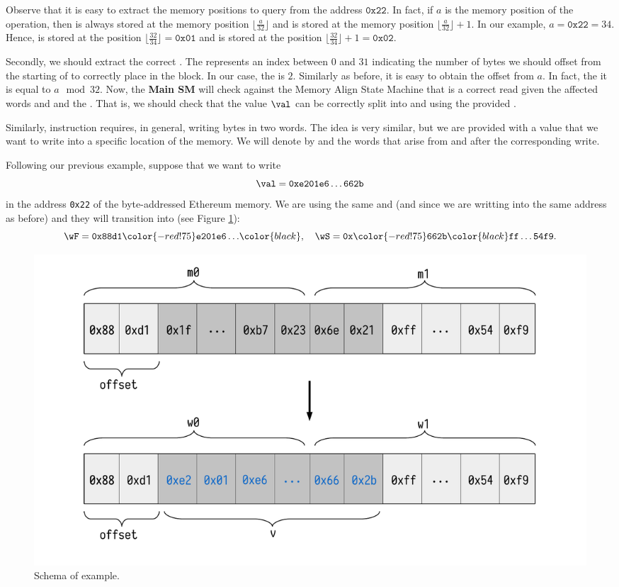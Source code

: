 Observe that it is easy to extract the memory positions to query from the address $\mathtt{0x22}$. In fact, if $a$ is the memory position of the \MLOAD operation, then \mF is always stored at the memory position $\lfloor \frac{a}{32} \rfloor$ and \mS is stored at the memory position $\lfloor \frac{a}{32} \rfloor + 1$. In our example, $a = \mathtt{0x22} = 34$. Hence, \mF is stored at the position $\lfloor \frac{32}{34} \rfloor = \mathtt{0x01}$ and \mS is stored at the position $\lfloor \frac{32}{34} \rfloor + 1= \mathtt{0x02}$. 

Secondly, we should extract the correct \offset. The \offset represents an index between $0$ and $31$ indicating the number of bytes we should offset from the starting of \mF to correctly place \val in the block. In our case, the \offset is $2$. Similarly as before, it is easy to obtain the offset from $a$. In fact, the it is equal to $a \mod{32}$. Now, the \textbf{Main SM} will check against the Memory Align State Machine that \val is a correct read given the affected words \mF and \mS and the \offset. That is, we should check that the value $\val$ can be correctly split into \mF and \mS using the provided \offset. 


Similarly, \MSTORE instruction requires, in general, writing bytes in two words.
The idea is very similar, but we are provided with a value \val that we want to write into a specific location of the memory. We will denote by \wF and \wS the words that arise from \mF and \mS after the corresponding write. 

Following our previous example, suppose that we want to write 
\[
\val = \mathtt{0xe201e6\dots662b}
\] 
in the address \texttt{0x22} of the byte-addressed Ethereum memory. We are using the same \mF and \mS (and since we are writting into the same address as before) and they will transition into  (see Figure \ref{fig:mstore-ex}):
\[
\wF = \mathtt{0x88d1}\color{-red!75}\mathtt{e201e6\dots}\color{black},\quad \wS =  \mathtt{0x}\color{-red!75} \mathtt{662b}\color{black} \mathtt{ff\dots54f9}.
\]

\begin{figure}[h!]
    \centering
    \includegraphics[width=1\columnwidth]{../figures/mstore_ex}
    \caption{Schema of \MSTORE example.}
    \label{fig:mstore-ex}
\end{figure}

